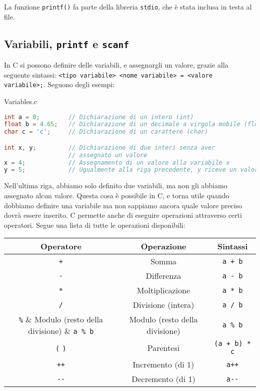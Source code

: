 La funzione \verb|printf()| fa parte della libreria \verb|stdio|, che è stata inclusa in testa al file.

\subsection{Variabili, \texttt{printf} e \texttt{scanf}}

In C si possono definire delle variabili, e assegnargli un valore, grazie alla seguente sintassi: \verb|<tipo variabile> <nome variabile> = <valore variabile>;|. Seguono degli esempi:

\begin{codeblock}{Variables.c}
    \begin{lstlisting}[language = c]
int a = 0;        // Dichiarazione di un intero (int)
float b = 4.65;   // Dichiarazione di un decimale a virgola mobile (float)
char c = 'c';     // Dichiarazione di un carattere (char)

int x, y;         // Dichiarazione di due interi senza aver 
                  // assegnato un valore
x = 4;            // Assegnamento di un valore alla variabile x
y = 5;            // Ugualmente alla riga precedente, y riceve un valore\end{lstlisting}
\end{codeblock}

Nell'ultima riga, abbiamo solo definito due variabili, ma non gli abbiamo assegnato alcun valore. Questa cosa è possibile in C, e torna utile quando dobbiamo definire una variabile ma non sappiamo ancora quale valore preciso dovrà essere inserito.
\nwl
C permette anche di eseguire operazioni attraverso certi operatori. Segue una lista di tutte le operazioni disponibili:
\begin{center}
    \begin{tabular}{|c|c|c|}
        \hline
        \textbf{Operatore} & \textbf{Operazione} & \textbf{Sintassi} \\
        \hline
        \verb|+| & Somma & \verb|a + b| \\
        \verb|-| & Differenza & \verb|a - b| \\
        \verb|*| & Moltiplicazione & \verb|a * b| \\
        \verb|/| & Divisione (intera) & \verb|a / b| \\
        \verb|%| & Modulo (resto della divisione) & \verb|a % b| \\
        \verb|(| \verb|)| & Parentesi & \verb|(a + b) * c| \\
        \verb|++| & Incremento (di 1) & \verb|a++| \\
        \verb|--| & Decremento (di 1) & \verb|a--| \\
        \hline
    \end{tabular}
\end{center}

